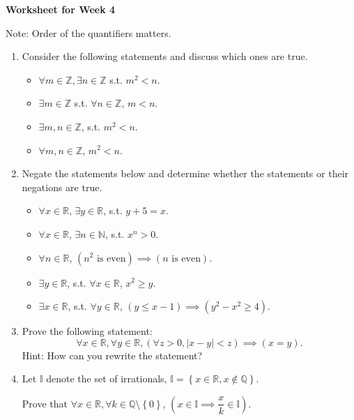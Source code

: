 \documentclass[12pt]{article}
\newcommand{\set}[1]{\left\{ #1 \right\}}
\begin{document}
\centerline{\bf\large Worksheet for Week 4}

\vspace{25pt}


Note: Order of the quantifiers matters.

\begin{enumerate}

\item Consider the following statements and discuss which ones are true.

\begin{itemize}
\item $\forall m\in\mathbb Z, \exists n\in\mathbb Z$ s.t. $m^2<n$.
\item $\exists m\in\mathbb Z$ s.t. $\forall n\in\mathbb Z$, $m<n$.
\item $\exists m,n\in\mathbb Z$, s.t. $m^2<n$.
\item $\forall m,n\in\mathbb Z$, $m^2<n$.
\end{itemize}

\item Negate the statements below and determine whether the statements or their negations are true.

\begin{itemize}
\item $\forall x\in\mathbb R$, $\exists y\in\mathbb R$, s.t. $y+5=x$.
\item $\forall x\in\mathbb R$, $\exists n\in\mathbb N$, s.t. $x^n>0$.
\item $\forall n\in\mathbb R$, $(n^2\text{ is even})\implies (n \text{ is even})$.
\item $\exists y\in\mathbb R$, s.t. $\forall x\in\mathbb R$, $x^2\geq y$.
\item $\exists x\in\mathbb R$, s.t. $\forall y\in\mathbb R$, $(y\leq x-1)\implies (y^2-x^2\geq 4)$.
\end{itemize}

\item Prove the following statement:
\[ \forall x\in\mathbb R, \forall y\in\mathbb R, (\forall z>0, |x-y|<z)\implies (x=y).  \]
Hint: How can you rewrite the statement?

\item Let $\mathbb I$ denote the set of irrationals, $\mathbb{I} = \set{x \in \mathbb{R}, x \not\in \mathbb{Q}}$.

Prove that $\forall x\in\mathbb R, \forall k \in \mathbb{Q}\setminus\set{0}$, $\left( x \in \mathbb{I} \implies \dfrac{x}{k}\in\mathbb I\right)$.


\end{enumerate}
\end{document}
